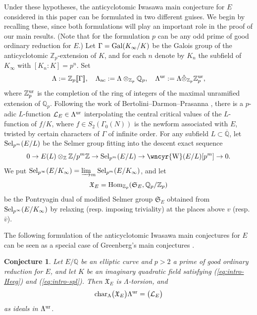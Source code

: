 \documentclass[10pt]{amsart}
\newcommand{\sha}{\text{\wncyr{W}}}
\numberwithin{equation}{section}
\newtheorem{conj}[theorem]{Conjecture}
\theoremstyle{definition}
\theoremstyle{remark}
\newcommand{\Z}{\mathbb{Z}}
\newcommand{\Lcal}{\mathcal{L}}
\newcommand{\bZ}{\mathbb{Z}}
\newcommand{\Q}{\mathbb{Q}}
\begin{document}
Under these hypotheses, the anticyclotomic Iwasawa main conjecture for $E$ {considered in this paper}
can be formulated in two different guises. We begin by recalling these, since both formulations will play an important role in the proof of our main results. (Note that for the formulation $p$ can be any odd prime of good ordinary reduction for $E$.) Let $\Gamma={\rm Gal}(K_\infty/K)$ be the Galois group of the anticyclotomic $\Z_p$-extension of $K$, and for each $n$ denote by $K_n$ the subfield of $K_\infty$ with $[K_n:K]=p^n$. Set
\[
\Lambda:=\Z_p\llbracket\Gamma\rrbracket,\quad\Lambda_{\rm ac}:=\Lambda\otimes_{\Z_p}\Q_p,\quad\Lambda^{\rm ur}:=\Lambda\hat\otimes_{\Z_p}\Z_p^{\rm ur},
\]
where $\Z_p^{\rm ur}$ is the completion of the ring of integers of the maximal unramified extension of $\Q_p$. 
Following the work of Bertolini--Darmon--Prasanna \cite{BDP}, there is a $p$-adic $L$-function $\mathcal{L}_E\in\Lambda^{\rm ur}$ interpolating the central critical values of {the $L$-function of}
 $f/K$, where $f\in S_2(\Gamma_0(N))$ is the newform associated with $E$, twisted by certain characters of $\Gamma$
of infinite order. For any subfield $L\subset\overline{\Q}$, let ${\rm Sel}_{p^m}(E/L)$ be the Selmer group fitting into the descent exact sequence
\[
0\rightarrow E(L)\otimes_{\Z}\Z/p^m\Z\rightarrow{\rm Sel}_{p^m}(E/L)\rightarrow\sha(E/L)[p^m]\rightarrow 0.
\]
We put ${\rm Sel}_{p^\infty}(E/K_\infty)=\varinjlim_m{\rm Sel}_{p^m}(E/K_\infty)$, %
and let 
\[
\mathfrak{X}_E={\rm Hom}_{\Z_p}(\mathfrak{S}_E,\Q_p/\bZ_p)
\] 
be the Pontryagin dual of {modified} Selmer group $\mathfrak{S}_E$ obtained from ${\rm Sel}_{p^\infty}(E/K_\infty)$ 
by relaxing (resp. imposing triviality) at the places above $v$ (resp. $\bar{v}$).

 
The following formulation of the anticyclotomic Iwasawa main conjectures for $E$ can be seen as a special case of Greenberg's main conjectures \cite{greenberg-motives}.

\begin{conj}\label{conj:BDP}
Let $E/\mathbb{Q}$ be an elliptic curve and $p>2$ a prime of good ordinary reduction for $E$, and let $K$ be an imaginary quadratic field satisfying {\rm (\ref{eq:intro-Heeg})} and  {\rm (\ref{eq:intro-spl})}. %
Then $\mathfrak{X}_E$ is $\Lambda$-torsion, and
\[
{\rm char}_\Lambda\bigl(\mathfrak{X}_E\bigr)\Lambda^{\rm ur}=\bigl(\Lcal_E\bigr)
\]
as ideals in $\Lambda^{\rm ur}$. 
\end{conj}
\end{document}
